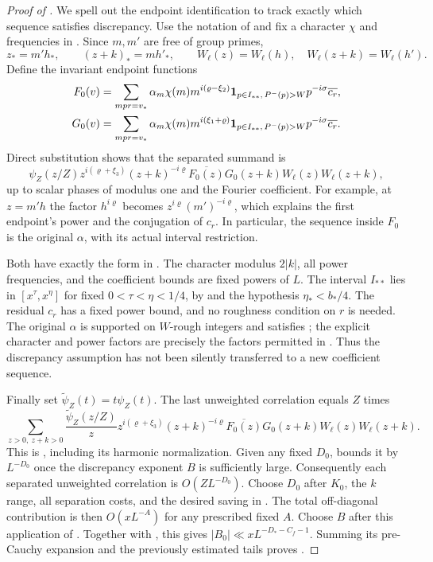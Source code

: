 \begin{proof}[Proof of ]
We spell out the endpoint identification to track exactly which
sequence satisfies discrepancy. Use the notation of
 and fix a character $\chi$
and frequencies in . Since $m,m'$ are
free of group primes,
\[
       z_*=m'h_*,\qquad (z+k)_*=mh'_*,\qquad
       W_\ell(z)=W_\ell(h),\quad W_\ell(z+k)=W_\ell(h').
\]
Define the invariant endpoint functions
\begin{align}
 F_0(v)&=\sum_{mpr=v_*}
   \alpha_m\chi(m)m^{i(\varrho-\xi_2)}
   \mathbf 1_{p\in I_{**},\,P^{-}(p)>W}p^{-i\sigma}\overline{c_r},
          \label{eq:typeii-first-endpoint}\\
 G_0(v)&=\sum_{mpr=v_*}
   \alpha_m\chi(m)m^{i(\xi_1+\varrho)}
   \mathbf 1_{p\in I_{**},\,P^{-}(p)>W}p^{-i\sigma}\overline{c_r}.
          \label{eq:typeii-second-endpoint}
\end{align}
Direct substitution shows that the separated summand is
\[
 \psi_Z(z/Z)z^{i(\varrho+\xi_3)}(z+k)^{-i\varrho}
       \overline{F_0(z)}G_0(z+k)W_\ell(z)W_\ell(z+k),
\]
up to scalar phases of modulus one and the Fourier coefficient.
For example, at $z=m'h$ the factor $h^{i\varrho}$ becomes
$z^{i\varrho}(m')^{-i\varrho}$, which explains the first endpoint's
power and the conjugation of $c_r$. In particular, the sequence inside
$F_0$ is the original $\alpha$, with its actual interval restriction.

Both  have
exactly the form in . The character modulus
$2|k|$, all power frequencies, and the coefficient bounds are fixed
powers of $L$. The interval $I_{**}$ lies in
$[x^\tau,x^\eta]$ for fixed $0<\tau<\eta<1/4$, by
 and the hypothesis $\eta_*<b_*/4$.
The residual $c_r$ has a fixed power bound, and no roughness condition
on $r$ is needed. The original $\alpha$ is supported on $W$-rough
integers and satisfies ; the explicit character
and power factors are precisely the factors permitted in
. Thus the discrepancy assumption has not been
silently transferred to a new coefficient sequence.

Finally set $\widetilde\psi_Z(t)=t\psi_Z(t)$. The last unweighted
correlation equals $Z$ times
\[
 \sum_{z>0,\ z+k>0}\frac{\widetilde\psi_Z(z/Z)}z
 z^{i(\varrho+\xi_3)}(z+k)^{-i\varrho}
       \overline{F_0(z)}G_0(z+k)W_\ell(z)W_\ell(z+k).
\]
This is , including its harmonic normalization.
Given any fixed $D_0$,  bounds it by $L^{-D_0}$
once the discrepancy exponent $B$ is sufficiently large. Consequently
each separated unweighted correlation is $O(ZL^{-D_0})$.
Choose $D_0$ after $K_0$, the $k$ range, all separation costs, and the
desired saving in . The total off-diagonal
contribution is then $O(xL^{-A})$ for any prescribed fixed $A$.
Choose $B$ after this application of . Together with
, this gives
$|B_0|\ll xL^{-D_*-C_{f}-1}$. Summing its pre-Cauchy expansion
and the previously estimated tails proves .
\end{proof}

